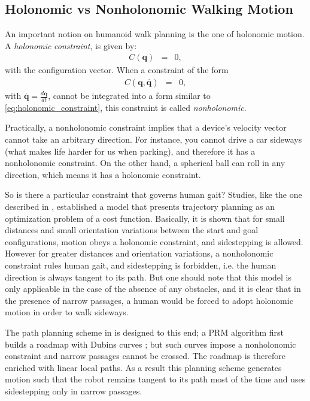 \subsection{Holonomic vs Nonholonomic Walking Motion}
\label{subsec:chap1-holonomic}

An important notion on humanoid walk planning is the one of holonomic
motion.
A \emph{holonomic} \emph{constraint}, is given by:
\begin{eqnarray} C(\mathbf{q}) & = & 0,
  \label{eq:holonomic_constraint}
\end{eqnarray}
with \config{} the configuration vector. When a constraint of the form
\begin{eqnarray}
  C(\mathbf{q,}\overset{.}{\mathbf{q}}) & = & 0,
\end{eqnarray}
with $\mathbf{\overset{.}{\mathbf{q}}=}\frac{d\mathbf{q}}{dt}$, cannot
be integrated into a form similar to \ref{eq:holonomic_constraint},
this constraint is called \emph{nonholonomic}.

Practically, a nonholonomic constraint implies that a device's
velocity vector cannot take an arbitrary direction. For instance, you
cannot drive a car sideways (what makes life harder for us when
parking), and therefore it has a nonholonomic constraint. On the other
hand, a spherical ball can roll in any direction, which means it has a
holonomic constraint.

So is there a particular constraint that governs human gait? Studies,
like the one described in \cite{momb10}, established a model that
presents trajectory planning as an optimization problem of a cost
function. Basically, it is shown that for small distances and small
orientation variations between the start and goal configurations,
motion obeys a holonomic constraint, and sidestepping is allowed.
However for greater distances and orientation variations, a
nonholonomic constraint rules human gait, and sidestepping is
forbidden, i.e. the human direction is always tangent to its path.
But one should note that this model is only applicable in the case of
the absence of any obstacles, and it is clear that in the presence of
narrow passages, a human would be forced to adopt holonomic motion in
order to walk sideways.

The path planning scheme in \cite{yosh08} is designed to this end; a
PRM algorithm first builds a roadmap with Dubins curves \cite{dubi57};
but such curves impose a nonholonomic constraint and narrow passages
cannot be crossed. The roadmap is therefore enriched with linear local
paths. As a result this planning scheme generates motion such that the
robot remains tangent to its path most of the time and uses
sidestepping only in narrow passages.

